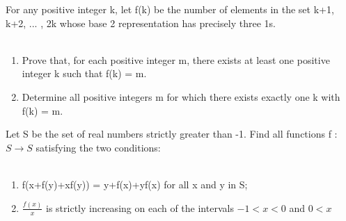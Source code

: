 \item For any positive integer k, let f(k) be the number of elements in the set {k+1, k+2, ... , 2k} whose base 2 representation has precisely three 1s.\\
\\ \begin{enumerate}
\item Prove that, for each positive integer m, there exists at least one positive integer k such that f(k) = m.
\item Determine all positive integers m for which there exists exactly one k with f(k) = m.
\end{enumerate}

\item Let S be the set of real numbers strictly greater than -1. Find all functions f : $S \rightarrow S$ satisfying the two conditions:\\
\\ \begin{enumerate}
\item f(x+f(y)+xf(y)) = y+f(x)+yf(x) for all x and y in S;
\item $\frac{f(x)}{x}$ is strictly increasing on each of the intervals $-1<x<0$ and $0<x$
\end{enumerate}




